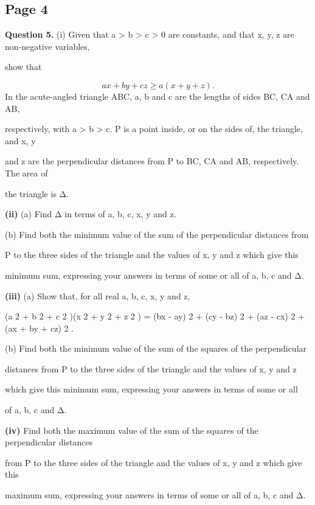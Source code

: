 \documentclass[12pt]{article}
\begin{document}
\subsection*{Page 4}
\begin{flushleft}
\bigskip\textbf{Question 5.} (i) Given that a > b > c > 0 are constants, and that x, y, z are non-negative variables,\par
show that\par
\[ax + by + cz \geq a(x + y + z).\]
In the acute-angled triangle ABC, a, b and c are the lengths of sides BC, CA and AB,\par
respectively, with a > b > c. P is a point inside, or on the sides of, the triangle, and x, y\par
and z are the perpendicular distances from P to BC, CA and AB, respectively. The area of\par
the triangle is Δ.\par
\textbf{(ii)} (a) Find Δ in terms of a, b, c, x, y and z.\par
(b) Find both the minimum value of the sum of the perpendicular distances from\par
P to the three sides of the triangle and the values of x, y and z which give this\par
minimum sum, expressing your answers in terms of some or all of a, b, c and Δ.\par
\textbf{(iii)} (a) Show that, for all real a, b, c, x, y and z,\par
(a 2 + b 2 + c 2 )(x 2 + y 2 + z 2 ) = (bx - ay) 2 + (cy - bz) 2 + (az - cx) 2 + (ax + by + cz) 2 .\par
(b) Find both the minimum value of the sum of the squares of the perpendicular\par
distances from P to the three sides of the triangle and the values of x, y and z\par
which give this minimum sum, expressing your answers in terms of some or all\par
of a, b, c and Δ.\par
\textbf{(iv)} Find both the maximum value of the sum of the squares of the perpendicular distances\par
from P to the three sides of the triangle and the values of x, y and z which give this\par
maximum sum, expressing your answers in terms of some or all of a, b, c and Δ.\par
\end{flushleft}
\end{document}
